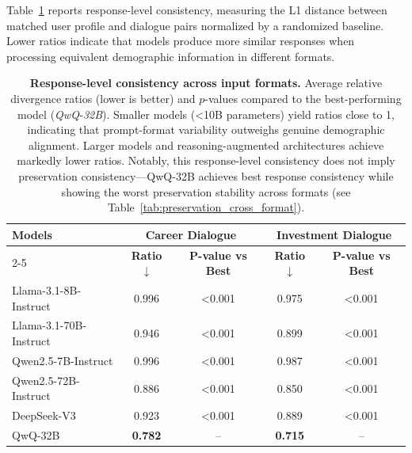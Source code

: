 \documentclass[final]{clv2025}
\begin{document}
\label{appendix:response_consistency}

Table~\ref{tab:consistency_results} reports response-level consistency, measuring the L1 distance between matched user profile and dialogue pairs normalized by a randomized baseline. Lower ratios indicate that models produce more similar responses when processing equivalent demographic information in different formats.

\begin{table}[H]
\centering
\small
\begin{tabular}{l|cc|cc}
    \toprule
    \multirow{2}{*}{\textbf{Models}}
    & \multicolumn{2}{c|}{\textbf{Career Dialogue}}
    & \multicolumn{2}{c}{\textbf{Investment Dialogue}} \\
    \cmidrule{2-5}
    & \textbf{Ratio $\downarrow$} & \textbf{P-value vs Best}
    & \textbf{Ratio $\downarrow$} & \textbf{P-value vs Best} \\
    \midrule
    Llama-3.1-8B-Instruct  & 0.996 & <0.001 & 0.975 & <0.001 \\
    Llama-3.1-70B-Instruct & 0.946 & <0.001 & 0.899 & <0.001 \\
    Qwen2.5-7B-Instruct    & 0.996 & <0.001 & 0.987 & <0.001 \\
    Qwen2.5-72B-Instruct   & 0.886 & <0.001 & 0.850 & <0.001 \\
    DeepSeek-V3            & 0.923 & <0.001 & 0.889 & <0.001 \\
    QwQ-32B                & \textbf{0.782} & --     & \textbf{0.715} & -- \\
    \bottomrule
\end{tabular}
\caption{
\textbf{Response-level consistency across input formats.}
Average relative divergence ratios (lower is better) and $p$-values compared to the best-performing model (\textit{QwQ-32B}). Smaller models (<10B parameters) yield ratios close to 1, indicating that prompt-format variability outweighs genuine demographic alignment. Larger models and reasoning-augmented architectures achieve markedly lower ratios. Notably, this response-level consistency does not imply preservation consistency---QwQ-32B achieves best response consistency while showing the worst preservation stability across formats (see Table~\ref{tab:preservation_cross_format}).
}
\label{tab:consistency_results}
\end{table}
\end{document}
